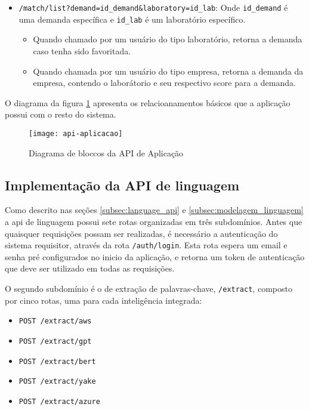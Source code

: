 \begin{itemize}
\begin{itemize}
        \end{itemize}
  \item \texttt{/match/list?demand=id\_demand\&laboratory=id\_lab}: Onde \texttt{id\_demand} é uma demanda específica e \texttt{id\_lab} é um laboratório específico.
        \begin{itemize}
          \item Quando chamado por um usuário do tipo laboratório, retorna a demanda caso tenha sido favoritada.
          \item Quando chamada por um usuário do tipo empresa, retorna a demanda da empresa, contendo o laborátorio e seu respectivo score para a demanda.
        \end{itemize}
\end{itemize}

O diagrama da figura \ref{fig:api_aplicacao} apresenta os relacioanamentos básicos que a aplicação possui com o resto do sistema.

\begin{figure}[H]
  \caption{Diagrama de bloccos da API de Aplicação}
  \texttt{[image: api-aplicacao]}
  \label{fig:api_aplicacao}
\end{figure}

\subsection{Implementação da API de linguagem}\label{subsec:api-linguagens}

Como descrito nas seções \ref{subsec:language_api} e \ref{subsec:modelagem_linguagem} a \gls{api} de linguagem possui sete rotas organizadas em três subdomínios. Antes que quaisquer requisições possam ser realizadas, é necessário a autenticação do sistema requisitor, através da rota \texttt{/auth/login}. Esta rota espera um email e senha pré configurados no inicio da aplicação, e retorna um token de autenticação que deve ser utilizado em todas as requisições.

O segundo subdomínio é o de extração de palavras-chave, \texttt{/extract}, composto por cinco rotas, uma para cada inteligência integrada:

\begin{itemize}
  \item \texttt{POST /extract/aws}
  \item \texttt{POST /extract/gpt}
  \item \texttt{POST /extract/bert}
  \item \texttt{POST /extract/yake}
  \item \texttt{POST /extract/azure}
\end{itemize}

